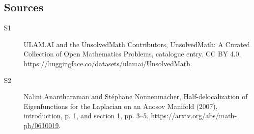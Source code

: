 \documentclass[11pt]{article}
\begin{document}
\subsection{Sources}
\begin{description}
\item[\hypertarget{source:statement:1}{S1}] ULAM.AI and the UnsolvedMath Contributors, UnsolvedMath: A Curated Collection of Open Mathematics Problems, catalogue entry. CC BY 4.0. \url{https://huggingface.co/datasets/ulamai/UnsolvedMath}.
\item[\hypertarget{source:statement:2}{S2}] Nalini Anantharaman and Stéphane Nonnenmacher, Half-delocalization of Eigenfunctions for the Laplacian on an Anosov Manifold (2007), introduction, p. 1, and section 1, pp. 3--5. \url{https://arxiv.org/abs/math-ph/0610019}.
\end{description}
\label{end:statement}
\end{document}
